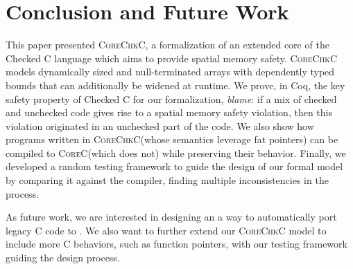 \documentclass[conference]{IEEEtran}
\newcommand{\lang}{\textsc{CoreChkC}\xspace}
\newcommand{\elang}{\textsc{CoreC}\xspace}
\newcommand{\CoreChkC}{\textsc{CoreChkC}\xspace}
\newcommand{\checkedc}{\text{Checked C}\xspace}
\begin{document}
 
\section{Conclusion and Future Work}
\label{sec:conclude}

This paper presented \CoreChkC, a formalization of an extended core of
the Checked C language which aims to provide spatial memory
safety. \lang models dynamically sized and
null-terminated arrays with dependently typed bounds that can
additionally be widened at runtime. We prove, in Coq, the key safety
property of Checked C for our formalization, {\em blame}: if a mix of
checked and unchecked code gives rise to a spatial memory safety
violation, then this violation originated in an unchecked part of the
code. We also show how programs written in \CoreChkC (whose
semantics leverage fat pointers) can be compiled to \elang (which does
not) while preserving their behavior. Finally, we developed a random
testing framework to guide the design of our formal model by comparing
it against the \checkedc compiler, finding multiple inconsistencies
in the process.

As future work, we are interested in designing an a way to
automatically port legacy C code to \checkedc.  We also want to
further extend our \CoreChkC model to include more C behaviors,
such as function pointers, with our testing framework guiding the
design process.
\end{document}
